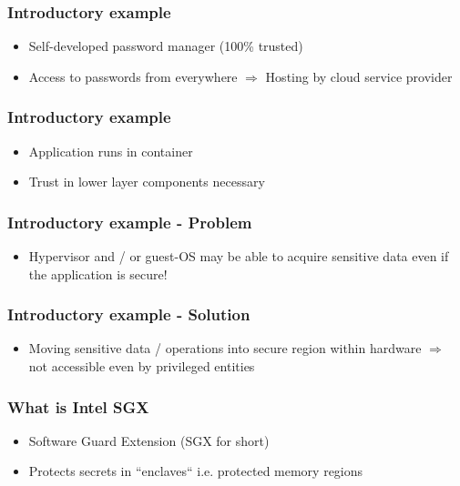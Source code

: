 \begin{frame}
    \frametitle{Introductory example}
    \begin{itemize}
        \item Self-developed password manager (100\% trusted)
        \item Access to passwords from everywhere \newline$ \Rightarrow$ Hosting by cloud service provider
    \end{itemize}
    \centering
\end{frame}

\begin{frame}
    \frametitle{Introductory example}
    \begin{itemize}
        \item Application runs in container
        \item Trust in lower layer components necessary
    \end{itemize}
    \centering
\end{frame}

\begin{frame}
    \frametitle{Introductory example - Problem}
    \begin{itemize}
        \item Hypervisor and / or guest-OS may be able to acquire sensitive data even if the application is secure!
    \end{itemize}
    \centering
\end{frame}

\begin{frame}
    \frametitle{Introductory example - Solution}
    \begin{itemize}
        \item Moving sensitive data / operations into secure region within hardware \newline $\Rightarrow$ not accessible even by privileged entities
    \end{itemize}
    \centering
\end{frame}

\begin{frame}
    \frametitle{What is Intel SGX}
    \begin{itemize}
        \item Software Guard Extension (SGX for short)
        \item Protects secrets in ``enclaves`` i.e. protected memory regions
    \end{itemize}
\end{frame}